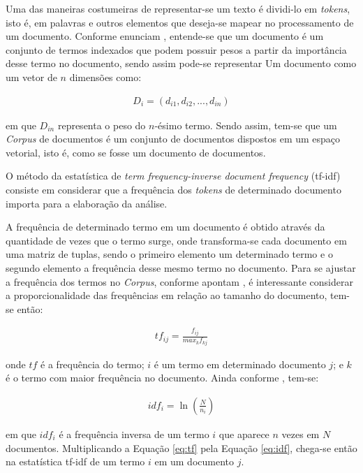
Uma das maneiras costumeiras de representar-se um texto é dividi-lo em \textit{tokens}, isto é, em palavras e outros elementos que deseja-se mapear no processamento de um documento. Conforme enunciam , entende-se que um documento é um conjunto de termos indexados que podem possuir pesos a partir da importância desse termo no documento, sendo assim pode-se representar Um documento como um vetor de $n$ dimensões como:

\begin{ceqn}
\begin{align} \label{eq:document_to_corpus}
D_{i} = (d_{i1}, d_{i2},...,d_{in})
\end{align}
\end{ceqn} em que $D_{in}$ representa o peso do $n$-ésimo termo. Sendo assim, tem-se que um \textit{Corpus} de documentos é um conjunto de documentos dispostos em um espaço vetorial, isto é, como se fosse um documento de documentos.

O método da estatística de \textit{term frequency-inverse document frequency} (tf-idf) consiste em considerar que a frequência dos \textit{tokens} de determinado documento importa para a elaboração da análise. 

A frequência de determinado termo em um documento é obtido através da quantidade de vezes que o termo surge, onde transforma-se cada documento em uma matriz de tuplas, sendo o primeiro elemento um determinado termo e o segundo elemento a frequência desse mesmo termo no documento. Para se ajustar a frequência dos termos no \textit{Corpus}, conforme apontam , é interessante considerar a proporcionalidade das frequências em relação ao tamanho do documento, tem-se então:

\begin{ceqn}
\begin{align} \label{eq:tf}
{tf}_{ij} = \frac{f_{ij}}{max_{k}f_{kj}}
\end{align}
\end{ceqn} onde $tf$ é a frequência do termo; $i$ é um termo em determinado documento $j$; e $k$ é o termo com maior frequência no documento. Ainda conforme , tem-se:

\begin{ceqn}
\begin{align} \label{eq:idf}
{idf}_{i} = \ln \left( \frac{N}{n_{i}} \right)
\end{align}
\end{ceqn} em que ${idf}_{i}$ é a frequência inversa de um termo $i$ que aparece $n$ vezes em $N$ documentos. Multiplicando a Equação \eqref{eq:tf} pela Equação \eqref{eq:idf}, chega-se então na estatística tf-idf de um termo $i$ em um documento $j$.

